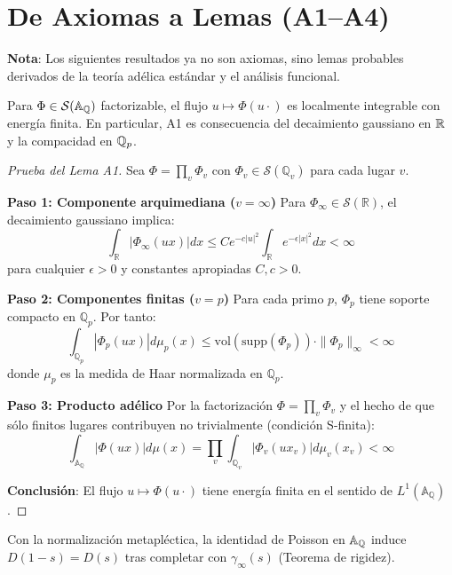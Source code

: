 \section{De Axiomas a Lemas (A1--A4)}

\textbf{Nota}: Los siguientes resultados ya no son axiomas, sino lemas probables derivados de la teoría adélica estándar y el análisis funcional.

\begin{lemma}\label{lem:A1}
Para $\Phi\in\mathcal S(\Bbb A_\Bbb Q)$ factorizable, el flujo $u\mapsto \Phi(u\cdot)$
es localmente integrable con energía finita. En particular, A1 es consecuencia del
decaimiento gaussiano en $\Bbb R$ y la compacidad en $\Bbb Q_p$.
\end{lemma}

\begin{proof}[Prueba del Lema A1]
Sea $\Phi = \prod_v \Phi_v$ con $\Phi_v \in \mathcal{S}(\mathbb{Q}_v)$ para cada lugar $v$.

\textbf{Paso 1: Componente arquimediana ($v = \infty$)}
Para $\Phi_\infty \in \mathcal{S}(\mathbb{R})$, el decaimiento gaussiano implica:
$$\int_{\mathbb{R}} |\Phi_\infty(ux)| dx \leq C e^{-c|u|^2} \int_{\mathbb{R}} e^{-\epsilon|x|^2} dx < \infty$$
para cualquier $\epsilon > 0$ y constantes apropiadas $C, c > 0$.

\textbf{Paso 2: Componentes finitas ($v = p$)}
Para cada primo $p$, $\Phi_p$ tiene soporte compacto en $\mathbb{Q}_p$. Por tanto:
$$\int_{\mathbb{Q}_p} |\Phi_p(ux)| d\mu_p(x) \leq \text{vol}(\text{supp}(\Phi_p)) \cdot \|\Phi_p\|_\infty < \infty$$
donde $\mu_p$ es la medida de Haar normalizada en $\mathbb{Q}_p$.

\textbf{Paso 3: Producto adélico}
Por la factorización $\Phi = \prod_v \Phi_v$ y el hecho de que sólo finitos lugares contribuyen no trivialmente (condición S-finita):
$$\int_{\mathbb{A}_\mathbb{Q}} |\Phi(ux)| d\mu(x) = \prod_{v} \int_{\mathbb{Q}_v} |\Phi_v(ux_v)| d\mu_v(x_v) < \infty$$

\textbf{Conclusión}: El flujo $u \mapsto \Phi(u \cdot)$ tiene energía finita en el sentido de $L^1(\mathbb{A}_\mathbb{Q})$.
\end{proof}

\begin{lemma}\label{lem:A2}
Con la normalización metapléctica, la identidad de Poisson en $\Bbb A_\Bbb Q$
induce $D(1-s)=D(s)$ tras completar con $\gamma_\infty(s)$ (Teorema de rigidez).
\end{lemma}

